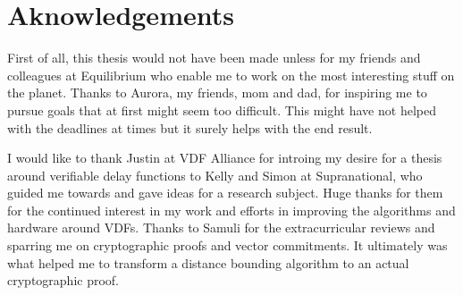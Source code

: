\chapter{Aknowledgements}
\label{Aknowledgements}
First of all, this thesis would not have been made unless for my friends and colleagues at Equilibrium who enable me to work on the most interesting stuff on the planet. Thanks to Aurora, my friends, mom and dad, for inspiring me to pursue goals that at first might seem too difficult. This might have not helped with the deadlines at times but it surely helps with the end result.

I would like to thank Justin at VDF Alliance for introing my desire for a thesis around verifiable delay functions to Kelly and Simon at Supranational, who guided me towards and gave ideas for a research subject. Huge thanks for them for the continued interest in my work and efforts in improving the algorithms and hardware around VDFs. Thanks to Samuli for the extracurricular reviews and sparring me on cryptographic proofs and vector commitments. It ultimately was what helped me to transform a distance bounding algorithm to an actual cryptographic proof.
